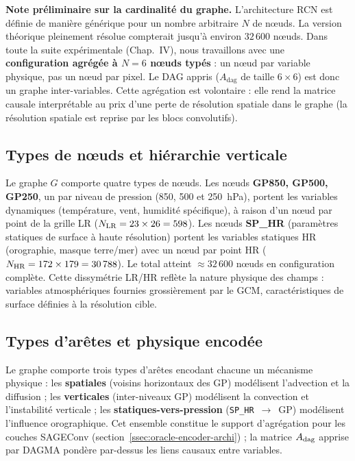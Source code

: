 \label{sec:oracle-graphe}

\noindent\textbf{Note préliminaire sur la cardinalité du graphe.} L'architecture RCN est définie de manière générique pour un nombre arbitraire $N$ de nœuds. La version théorique pleinement résolue compterait jusqu'à environ $32\,600$ nœuds. Dans toute la suite expérimentale (Chap.~IV), nous travaillons avec une \textbf{configuration agrégée à $N = 6$ nœuds typés} : un nœud par variable physique, pas un nœud par pixel. Le DAG appris ($A_{\mathrm{dag}}$ de taille $6 \times 6$) est donc un graphe inter-variables. Cette agrégation est volontaire : elle rend la matrice causale interprétable au prix d'une perte de résolution spatiale dans le graphe (la résolution spatiale est reprise par les blocs convolutifs).

\subsection{Types de nœuds et hiérarchie verticale}
\label{ssec:oracle-types-noeuds}

Le graphe $G$ comporte quatre types de nœuds. Les nœuds \textbf{GP850, GP500, GP250}, un par niveau de pression (850, 500 et 250~hPa), portent les variables dynamiques (température, vent, humidité spécifique), à raison d'un nœud par point de la grille LR ($N_{\text{LR}} = 23\times 26 = 598$). Les nœuds \textbf{SP\_HR} (paramètres statiques de surface à haute résolution) portent les variables statiques HR (orographie, masque terre/mer) avec un nœud par point HR ($N_{\text{HR}} = 172\times 179 = 30\,788$). Le total atteint $\approx 32\,600$ nœuds en configuration complète. Cette dissymétrie LR/HR reflète la nature physique des champs : variables atmosphériques fournies grossièrement par le GCM, caractéristiques de surface définies à la résolution cible.

\subsection{Types d'arêtes et physique encodée}
\label{ssec:oracle-types-aretes}

Le graphe comporte trois types d'arêtes encodant chacune un mécanisme physique : les \textbf{spatiales} (voisins horizontaux des GP) modélisent l'advection et la diffusion ; les \textbf{verticales} (inter-niveaux GP) modélisent la convection et l'instabilité verticale ; les \textbf{statiques-vers-pression} (\texttt{SP\_HR}~$\to$~GP) modélisent l'influence orographique. Cet ensemble constitue le support d'agrégation pour les couches SAGEConv (section~\ref{ssec:oracle-encoder-archi}) ; la matrice $A_{\mathrm{dag}}$ apprise par DAGMA pondère par-dessus les liens causaux entre variables.

